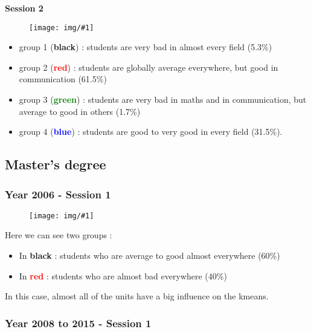 \documentclass[11pt, a4paper]{article}
\newcommand\image[2]{
	\begin{figure}[H]
	\centering
	\texttt{[image: img/\#1]}
	\end{figure}
}
\begin{document}
    \newpage
    
    \textbf{\large{Session 2}}
    
    \image{image17.png}{480px}

    \begin{multicols}{2}
        \begin{itemize}
            \item group 1 (\textbf{black}) : students are very bad in almost every field (5.3\%)
            \item group 2 (\textbf{\textcolor{red}{red}}) : students are globally average everywhere, but good in communication (61.5\%)
            \item group 3 (\textbf{\textcolor{green}{green}}) : students are very bad in maths and in communication, but average to good in others (1.7\%)
            \item group 4 (\textbf{\textcolor{blue}{blue}}) : students are good to very good in every field (31.5\%).
         \end{itemize}
    \end{multicols}
    
    \newpage
    
    \subsection{Master's degree}
    
    \subsubsection{Year 2006 - Session 1}
    
    \image{M2-2006.png}{480px}
    
    Here we can see two groups :
    \begin{itemize}
        \item In \textbf{black} : students who are average to good almost everywhere (60\%)
        \item In \textbf{\textcolor{red}{red}} : students who are almost bad everywhere (40\%)
    \end{itemize}
    In this case, almost all of the units have a big influence on the kmeans.
    
    \newpage
    
    \subsubsection{Year 2008 to 2015 - Session 1}
    
\end{document}
